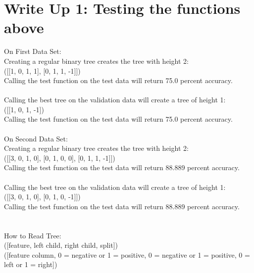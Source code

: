 \documentclass{article}
\begin{document}
\section{Write Up 1: Testing the functions above}
On First Data Set:\\
Creating a regular binary tree creates the tree with height 2: \\
([[1, 0, 1, 1], [0, 1, 1, -1]])\\
Calling the test function on the test data will return 75.0 percent accuracy.
\\\\
Calling the best tree on the validation data will create a tree of height 1:\\
([[1, 0, 1, -1])\\
Calling the test function on the test data will return 75.0 percent accuracy.\\\\
On Second Data Set:\\
Creating a regular binary tree creates the tree with height 2: \\
([[3, 0, 1, 0], [0, 1, 0, 0], [0, 1, 1, -1]])\\
Calling the test function on the test data will return 88.889 percent accuracy.
\\\\
Calling the best tree on the validation data will create a tree of height 1:\\
([[3, 0, 1, 0], [0, 1, 0, -1]])\\
Calling the test function on the test data will return 88.889 percent accuracy.\\\\
\\How to Read Tree: \\ ([feature, left child, right child, split])
\\([feature column, 0 = negative or 1 = positive, 0 = negative or 1 = positive, 0 = left or 1 = right])
\end{document}
